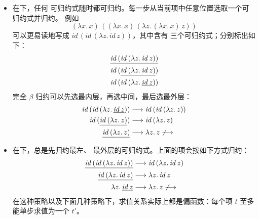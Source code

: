 \begin{itemize}
  \item 在下，任何
    可归约式随时都可归约。每一步从当前项中任意位置选取一个可归约式并归约。
    例如
    \[
      (\lambda x.\,x)\,
      ((\lambda x.\,x)\,(\lambda z.\,(\lambda x.\,x)\,z))
    \]
    可以更易读地写成
    \(\mathit{id}\,(\mathit{id}\,(\lambda z.\,\mathit{id}\,z))\)，其中含有
    三个可归约式；分别标出如下：
    \[
    \begin{aligned}
      &\underline{\mathit{id}\,
        (\mathit{id}\,(\lambda z.\,\mathit{id}\,z))}\\
      &\mathit{id}\,
        (\underline{\mathit{id}\,(\lambda z.\,\mathit{id}\,z)})\\
      &\mathit{id}\,
        (\mathit{id}\,(\lambda z.\,\underline{\mathit{id}\,z}))
    \end{aligned}
    \]
    完全 \(\beta\) 归约可以先选最内层，再选中间，最后选最外层：
    \[
    \begin{aligned}
      \mathit{id}\,
        (\mathit{id}\,(\lambda z.\,\underline{\mathit{id}\,z}))
      &\mathrel{\longrightarrow} \mathit{id}\,(\mathit{id}\,(\lambda z.\,z))\\
      \mathit{id}\,
        (\underline{\mathit{id}\,(\lambda z.\,z)})
      &\mathrel{\longrightarrow} \mathit{id}\,(\lambda z.\,z)\\
      \underline{\mathit{id}\,(\lambda z.\,z)}
      &\mathrel{\longrightarrow} \lambda z.\,z
      \not\mathrel{\longrightarrow}
    \end{aligned}
    \]


  \item 在下，总是先归约最左、
    最外层的可归约式。上面的项会按如下方式归约：
    \[
    \begin{aligned}
      \underline{\mathit{id}\,
        (\mathit{id}\,(\lambda z.\,\mathit{id}\,z))}
      &\mathrel{\longrightarrow} \mathit{id}\,(\lambda z.\,\mathit{id}\,z)\\
      \underline{\mathit{id}\,(\lambda z.\,\mathit{id}\,z)}
      &\mathrel{\longrightarrow} \lambda z.\,\mathit{id}\,z\\
      \lambda z.\,\underline{\mathit{id}\,z}
      &\mathrel{\longrightarrow} \lambda z.\,z
      \not\mathrel{\longrightarrow}
    \end{aligned}
    \]
    在这种策略以及下面几种策略下，求值关系实际上都是偏函数：每个项 \(t\)
    至多能单步求值为一个 \(t'\)。


\end{itemize}
